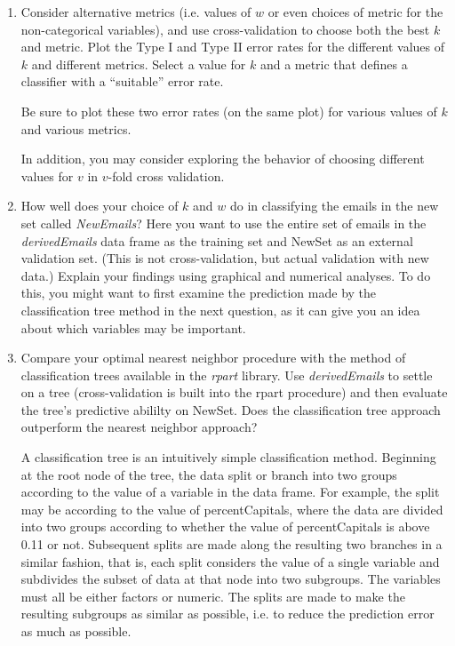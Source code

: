 \documentclass{article}
\def\Rpackage#1{\textit{#1}}
\def\Svar#1{\textsl{#1}}
\begin{document}
\begin{enumerate}
\item Consider alternative metrics (i.e. values of $w$ or even choices
  of metric for the non-categorical variables), and use cross-validation to
  choose both the best $k$ and metric.  Plot the Type I and Type II
  error rates for the different values of $k$ and different metrics.
  Select a value for $k$ and a metric that defines a classifier with a
  ``suitable'' error rate.


Be sure to plot these two error rates (on the same plot) 
for various values of $k$ and various metrics.

In addition, you may consider exploring the behavior of choosing 
different values for $v$ in $v$-fold cross validation.


\item How well does your choice of $k$ and $w$ do in classifying the
  emails in the new set called \Svar{NewEmails}? Here you want to use the entire
  set of emails in the \Svar{derivedEmails} data frame as the training set
  and NewSet as an external validation set. (This is not
  cross-validation, but actual validation with new data.) Explain your
  findings using graphical and numerical analyses.  To do this, you
  might want to first examine the prediction made by the
  classification tree method in the next question, as it can give you
  an idea about which variables may be important.

\item Compare your optimal nearest neighbor procedure with the method
  of classification trees available in the \Rpackage{rpart} library.
  Use \Svar{derivedEmails} to settle on a tree (cross-validation is built
  into the rpart procedure) and then evaluate the tree's predictive
  abililty on NewSet.  Does the classification tree approach
  outperform the nearest neighbor approach?

  A classification tree is an intuitively simple classification
  method. Beginning at the root node of the tree, the data split or
  branch into two groups according to the value of a variable in the
  data frame. For example, the split may be according to the value of
  percentCapitals, where the data are divided into two groups
  according to whether the value of percentCapitals is above 0.11 or
  not.  Subsequent splits are made along the resulting two branches in
  a similar fashion, that is, each split considers the value of a
  single variable and subdivides the subset of data at that node into
  two subgroups.  The variables must all be either factors or numeric.
  The splits are made to make the resulting subgroups as similar as
  possible, i.e. to reduce the prediction error as much as possible.


\end{enumerate}
\end{document}
